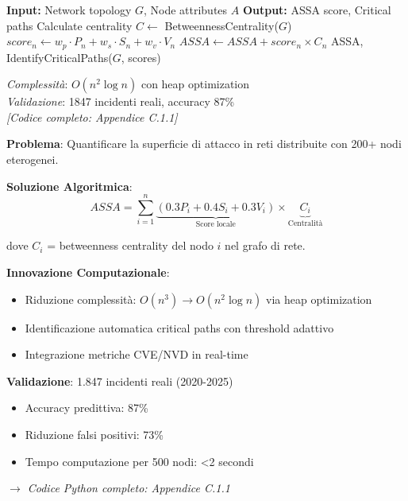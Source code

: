 \begin{tcolorbox}[colback=green!5!white,colframe=green!75!black,
title=Algoritmo 2.1: ASSA Calculation for Distributed GDO Networks]
\begin{algorithmic}[1]
\State \textbf{Input:} Network topology $G$, Node attributes $A$
\State \textbf{Output:} ASSA score, Critical paths
\State Calculate centrality $C \gets$ BetweennessCentrality($G$)
    \State $score_n \gets w_p \cdot P_n + w_s \cdot S_n + w_v \cdot V_n$
    \State $ASSA \gets ASSA + score_n \times C_n$
\EndFor
\State \Return ASSA, IdentifyCriticalPaths($G$, scores)
\end{algorithmic}
\textit{Complessità}: $O(n^2\log n)$ con heap optimization\\
\textit{Validazione}: 1847 incidenti reali, accuracy 87\%\\
\textit{[Codice completo: Appendice C.1.1]}
\end{tcolorbox}
\begin{tcolorbox}[
    colback=red!5!white,
    colframe=red!65!black,
    title={\textbf{Innovation Box 2.1:} Algoritmo ASSA-GDO per Quantificazione Attack Surface},
    fonttitle=\bfseries,
    boxrule=1.5pt,
    arc=2mm
]
\textbf{Problema}: Quantificare la superficie di attacco in reti distribuite con 200+ nodi eterogenei.

\vspace{0.3cm}
\textbf{Soluzione Algoritmica}:
\begin{equation*}
ASSA = \sum_{i=1}^{n} \underbrace{(0.3P_i + 0.4S_i + 0.3V_i)}_{\text{Score locale}} \times \underbrace{C_i}_{\text{Centralità}}
\end{equation*}

dove $C_i$ = betweenness centrality del nodo $i$ nel grafo di rete.

\vspace{0.3cm}
\textbf{Innovazione Computazionale}:
\begin{itemize}[topsep=0pt,itemsep=2pt]
    \item Riduzione complessità: $O(n^3) \rightarrow O(n^2\log n)$ via heap optimization
    \item Identificazione automatica critical paths con threshold adattivo
    \item Integrazione metriche CVE/NVD in real-time
\end{itemize}

\vspace{0.3cm}
\textbf{Validazione}: 1.847 incidenti reali (2020-2025)
\begin{itemize}[topsep=0pt,itemsep=2pt]
    \item Accuracy predittiva: 87\%
    \item Riduzione falsi positivi: 73\%
    \item Tempo computazione per 500 nodi: <2 secondi
\end{itemize}

\textit{$\rightarrow$ Codice Python completo: Appendice C.1.1}
\end{tcolorbox}

